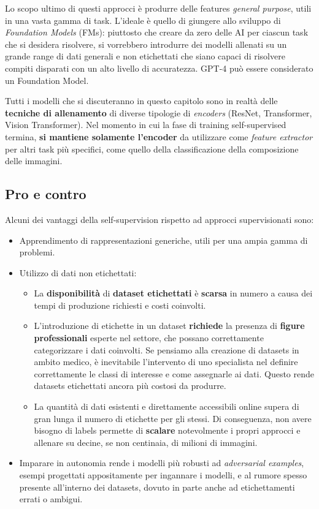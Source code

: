Lo scopo ultimo di questi approcci è produrre delle features \textit{general purpose}, utili in una vasta gamma di task. L'ideale è quello di giungere allo sviluppo di \textit{Foundation Models} (FMs): piuttosto che creare da zero delle AI per ciascun task che si desidera risolvere, si vorrebbero introdurre dei modelli allenati su un grande range di dati generali e non etichettati che siano capaci di risolvere compiti disparati con un alto livello di accuratezza. GPT-4 può essere considerato un Foundation Model.

Tutti i modelli che si discuteranno in questo capitolo sono in realtà delle \textbf{tecniche di allenamento} di diverse tipologie di \textit{encoders} (ResNet, Transformer, Vision Transformer). Nel momento in cui la fase di training self-supervised termina, \textbf{si mantiene solamente l'encoder} da utilizzare come \textit{feature extractor} per altri task più specifici, come quello della classificazione della composizione delle immagini.

\subsection{Pro e contro}
Alcuni dei vantaggi della self-supervision rispetto ad approcci supervisionati sono:
\begin{itemize}
    \item Apprendimento di rappresentazioni generiche, utili per una ampia gamma di problemi.
    \item Utilizzo di dati non etichettati:
    \begin{itemize}
        \item La \textbf{disponibilità} di \textbf{dataset etichettati} è \textbf{scarsa} in numero a causa dei tempi di produzione richiesti e costi coinvolti.
        \item L'introduzione di etichette in un dataset \textbf{richiede} la presenza di \textbf{figure professionali} esperte nel settore, che possano correttamente categorizzare i dati coinvolti. Se pensiamo alla creazione di datasets in ambito medico, è inevitabile l'intervento di uno specialista nel definire correttamente le classi di interesse e come assegnarle ai dati. Questo rende datasets etichettati ancora più costosi da produrre.
        \item La quantità di dati esistenti e direttamente accessibili online supera di gran lunga il numero di etichette per gli stessi. Di conseguenza, non avere bisogno di labels permette di \textbf{scalare} notevolmente i propri approcci e allenare su decine, se non centinaia, di milioni di immagini. 
    \end{itemize}
    \item Imparare in autonomia rende i modelli più robusti ad \textit{adversarial examples}, esempi progettati appositamente per ingannare i modelli, e al rumore spesso presente all'interno dei datasets, dovuto in parte anche ad etichettamenti errati o ambigui.
\end{itemize}

